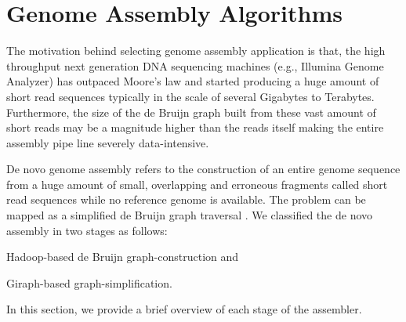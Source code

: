 \documentclass[journal]{IEEEtran}
\begin{document}
\section{Genome Assembly Algorithms}
\label{app:GenomeAssemblyAlgorithms}
The motivation behind selecting genome assembly application is that, the high throughput next generation DNA sequencing machines (e.g., Illumina Genome Analyzer) has outpaced Moore's law and started producing a huge amount of short read sequences typically in the scale of several Gigabytes to Terabytes. Furthermore, the size of the de Bruijn graph built from these vast amount of short reads may be a magnitude higher than the reads itself making the entire assembly pipe line severely data-intensive.

De novo genome assembly refers to the construction of an entire genome sequence from a huge amount of small, overlapping and erroneous fragments called short read sequences while no reference genome is available. The problem can be mapped as a simplified de Bruijn graph traversal \cite{bio:debruijngraph}. We classified the de novo assembly in two stages as follows:
\begin{inparaenum}
\item Hadoop-based de Bruijn graph-construction and
\item Giraph-based graph-simplification.  
\end{inparaenum}
In this section, we provide a brief overview of each stage of the assembler. 
\end{document}
